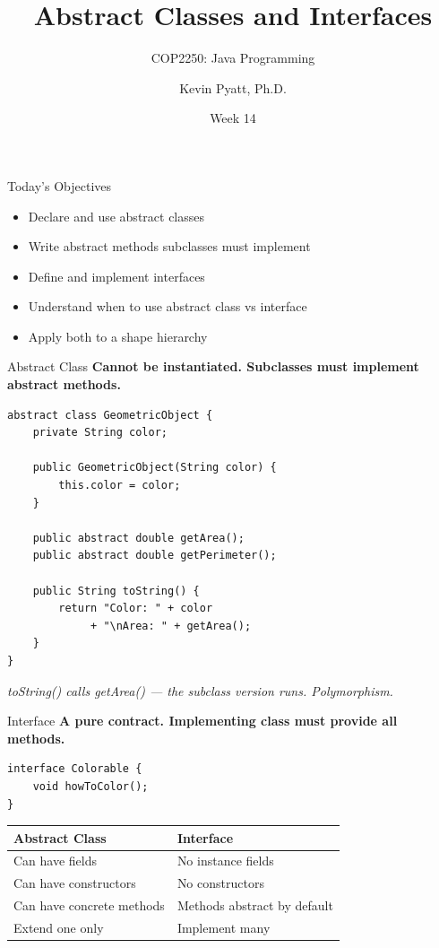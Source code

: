 \documentclass{beamer}
\title[Abstract Classes \& Interfaces]{Abstract Classes and Interfaces}
\subtitle{COP2250: Java Programming}
\author{Kevin Pyatt, Ph.D.}
\institute{State College of Florida \\ Pyatt Labs}
\date{Week 14}
\begin{document}
\begin{frame}
  \titlepage
\end{frame}
\begin{frame}{Today's Objectives}
\begin{itemize}
  \item Declare and use abstract classes
  \item Write abstract methods subclasses must implement
  \item Define and implement interfaces
  \item Understand when to use abstract class vs interface
  \item Apply both to a shape hierarchy
\end{itemize}
\end{frame}
\begin{frame}[fragile]{Abstract Class}
\textbf{Cannot be instantiated. Subclasses must implement abstract methods.}
\begin{lstlisting}
abstract class GeometricObject {
    private String color;

    public GeometricObject(String color) {
        this.color = color;
    }

    public abstract double getArea();
    public abstract double getPerimeter();

    public String toString() {
        return "Color: " + color
             + "\nArea: " + getArea();
    }
}
\end{lstlisting}
\textit{toString() calls getArea() --- the subclass version runs. Polymorphism.}
\end{frame}
\begin{frame}[fragile]{Interface}
\textbf{A pure contract. Implementing class must provide all methods.}
\begin{lstlisting}
interface Colorable {
    void howToColor();
}
\end{lstlisting}
\vspace{0.3cm}
\begin{tabular}{ll}
\toprule
\textbf{Abstract Class} & \textbf{Interface} \\
\midrule
Can have fields & No instance fields \\
Can have constructors & No constructors \\
Can have concrete methods & Methods abstract by default \\
Extend one only & Implement many \\
\bottomrule
\end{tabular}
\end{frame}
\end{document}

